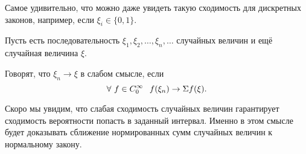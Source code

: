 Самое удивительно, что можно даже увидеть такую сходимость для дискретных законов, например, если $\xi_i\in\{0,1\}$.

Пусть есть последовательность $\xi_1,\xi_2,\dots,\xi_n,\dots$ случайных величин и ещё случайная величина $\xi$.
\begin{Def}
Говорят, что $\xi_n\to \xi$ в слабом смысле, если
\[
  \forall\ f\in C_0^\infty\pau
  f(\xi_n) \to \E f(\xi).
\]
\end{Def}
Скоро мы увидим, что слабая сходимость случайных величин гарантирует сходимость вероятности попасть в заданный интервал. Именно в этом смысле будет доказывать сближение нормированных сумм случайных величин к нормальному закону.
